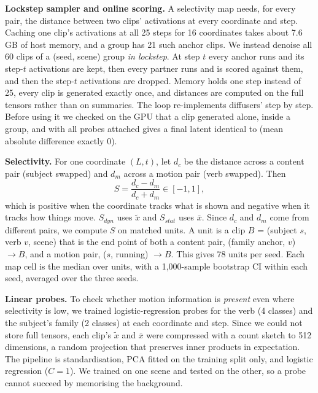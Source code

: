 \documentclass[twoside,english]{article}
\newcommand{\xs}{\bar{x}}         %
\newcommand{\xd}{\tilde{x}}       %
\begin{document}
\textbf{Lockstep sampler and online scoring.} A selectivity map needs, for every pair, the distance
between two clips' activations at every coordinate and step. Caching one clip's activations at all 25
steps for 16 coordinates takes about 7.6\,GB of host memory, and a group has 21 such anchor clips. We
instead denoise all 60 clips of a (seed, scene) group \emph{in lockstep}. At step $t$ every anchor runs
and its step-$t$ activations are kept, then every partner runs and is scored against them, and then the
step-$t$ activations are dropped. Memory holds one step instead of 25, every clip is generated exactly
once, and distances are computed on the full tensors rather than on summaries. The loop re-implements
diffusers'  step by step. Before using it we checked on the GPU that a clip
generated alone, inside a group, and with all probes attached gives a final latent identical to
 (mean absolute difference exactly 0).

\textbf{Selectivity.} For one coordinate $(L,t)$, let $d_c$ be the distance across a content pair
(subject swapped) and $d_m$ across a motion pair (verb swapped). Then
\begin{equation}
S = \frac{d_c - d_m}{d_c + d_m} \in [-1, 1], \label{eq:sel}
\end{equation}
which is positive when the coordinate tracks what is shown and negative when it tracks how things
move. $S_{dyn}$ uses $\xd$ and $S_{stat}$ uses $\xs$. Since $d_c$ and $d_m$ come from different pairs, we
compute $S$ on matched units. A unit is a clip $B$ = (subject $s$, verb $v$, scene) that is the end point
of both a content pair, (family anchor, $v$) $\to B$, and a motion pair, ($s$, running) $\to B$. This gives
78 units per seed. Each map cell is the median over units, with a 1{,}000-sample bootstrap CI within each
seed, averaged over the three seeds.

\textbf{Linear probes.} To check whether motion information is \emph{present} even where selectivity is
low, we trained logistic-regression probes for the verb (4 classes) and the subject's family (2 classes)
at each coordinate and step. Since we could not store full tensors, each clip's $\xd$ and $\xs$ were
compressed with a count sketch to 512 dimensions, a random projection that preserves inner products in
expectation. The pipeline is standardisation, PCA fitted on the training split only, and logistic
regression ($C=1$). We trained on one scene and tested on the other, so a probe cannot succeed by
memorising the background.
\end{document}

